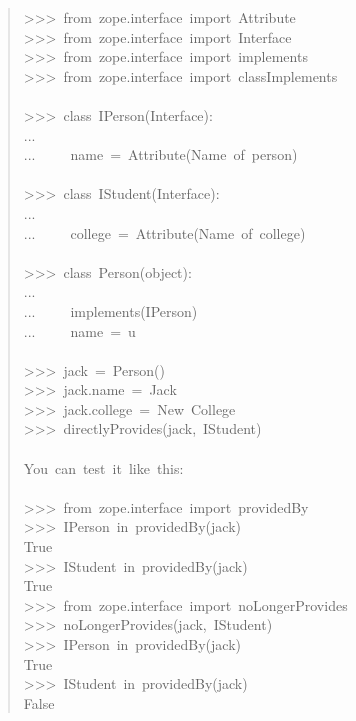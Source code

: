 \documentclass[14pt,a4paper,openany,twoside,final]{extbook}
\begin{document}
\begin{quote}{\ttfamily \raggedright \noindent
>{}>{}>~from~zope.interface~import~Attribute\\
>{}>{}>~from~zope.interface~import~Interface\\
>{}>{}>~from~zope.interface~import~implements\\
>{}>{}>~from~zope.interface~import~classImplements\\
~\\
>{}>{}>~class~IPerson(Interface):\\
...\\
...~~~~~name~=~Attribute(\textquotedbl{}Name~of~person\textquotedbl{})\\
~\\
>{}>{}>~class~IStudent(Interface):\\
...\\
...~~~~~college~=~Attribute(\textquotedbl{}Name~of~college\textquotedbl{})\\
~\\
>{}>{}>~class~Person(object):\\
...\\
...~~~~~implements(IPerson)\\
...~~~~~name~=~u\textquotedbl{}\textquotedbl{}\\
~\\
>{}>{}>~jack~=~Person()\\
>{}>{}>~jack.name~=~\textquotedbl{}Jack\textquotedbl{}\\
>{}>{}>~jack.college~=~\textquotedbl{}New~College\textquotedbl{}\\
>{}>{}>~directlyProvides(jack,~IStudent)\\
~\\
You~can~test~it~like~this:\\
~\\
>{}>{}>~from~zope.interface~import~providedBy\\
>{}>{}>~IPerson~in~providedBy(jack)\\
True\\
>{}>{}>~IStudent~in~providedBy(jack)\\
True\\
>{}>{}>~from~zope.interface~import~noLongerProvides\\
>{}>{}>~noLongerProvides(jack,~IStudent)\\
>{}>{}>~IPerson~in~providedBy(jack)\\
True\\
>{}>{}>~IStudent~in~providedBy(jack)\\
False
}
\end{quote}
\end{document}

